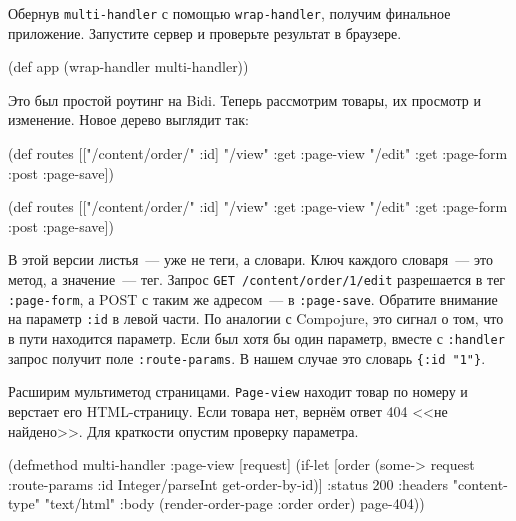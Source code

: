 Обернув \verb|multi-handler| с помощью \texttt{wrap\--hand\-ler}, получим
финальное приложение. Запустите сервер и проверьте результат в браузере.

\begin{english}
  \begin{clojure}
(def app (wrap-handler multi-handler))
  \end{clojure}
\end{english}

Это был простой роутинг на Bidi. Теперь рассмотрим товары, их
просмотр и изменение. Новое дерево выглядит так:

\ifnarrow

\begin{english}
  \begin{clojure}
(def routes
  [["/content/order/" :id]
   {"/view" {:get  :page-view}
    "/edit" {:get  :page-form
             :post :page-save}}])
  \end{clojure}
\end{english}

\else

\begin{english}
  \begin{clojure}
(def routes
  [["/content/order/" :id] {"/view" {:get  :page-view}
                            "/edit" {:get  :page-form
                                     :post :page-save}}])
  \end{clojure}
\end{english}

\fi

\mnoindent В этой версии листья~--- уже не теги, а словари. Ключ каждого
словаря~--- это метод, а значение~--- тег. Запрос \texttt{GET /content/\-order/1/\-edit}
разрешается в тег \verb|:page-form|, а POST с таким же адресом~--- в
\verb|:page-save|. Обратите внимание на параметр \verb|:id| в левой части. По
аналогии с Compojure, это сигнал о том, что в пути находится параметр. Если был
хотя бы один параметр, вместе с \texttt{:handler} запрос получит поле
\texttt{:route-params}. В нашем случае это словарь \verb|{:id "1"}|.


\mnoindent Расширим мультиметод страницами. \verb|Page-view| находит товар по
номеру и верстает его HTML-страницу. Если товара нет, вернём ответ 404 <<не
найдено>>. Для краткости опустим проверку параметра.

\ifnarrow

\begin{english}
  \begin{clojure}
(defmethod multi-handler :page-view
  [request]
  (if-let [order (some->
                   request
                   :route-params
                   :id
                   Integer/parseInt
                   get-order-by-id)]
    {:status 200
     :headers {"content-type"
               "text/html"}
     :body (render-order-page
             {:order order})}
    page-404))
  \end{clojure}
\end{english}

